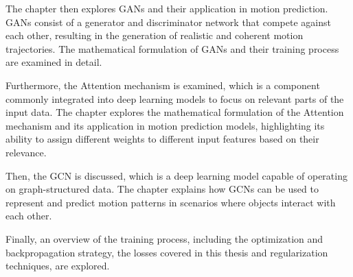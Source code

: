 The chapter then explores \acp{GAN} and their application in motion prediction. \acp{GAN} consist of a generator and discriminator network that compete against each other, resulting in the generation of realistic and coherent motion trajectories. The mathematical formulation of \acp{GAN} and their training process are examined in detail.

Furthermore, the Attention mechanism is examined, which is a component commonly integrated into deep learning models to focus on relevant parts of the input data. The chapter explores the mathematical formulation of the Attention mechanism and its application in motion prediction models, highlighting its ability to assign different weights to different input features based on their relevance.

Then, the \ac{GCN} is discussed, which is a deep learning model capable of operating on graph-structured data. The chapter explains how \acp{GCN} can be used to represent and predict motion patterns in scenarios where objects interact with each other.

Finally, an overview of the training process, including the optimization and backpropagation strategy, the losses covered in this thesis and regularization techniques, are explored. %
